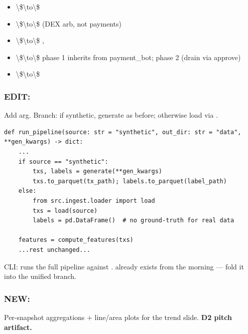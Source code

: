 \documentclass[11pt]{article}
\begin{document}
\begin{itemize}
  \item {} \textbackslash{}\$\textbackslash{}to\textbackslash{}\$ 
  \item {} \textbackslash{}\$\textbackslash{}to\textbackslash{}\$  (DEX arb, not payments)
  \item {} \textbackslash{}\$\textbackslash{}to\textbackslash{}\$ \textbf{}, 
  \item {} \textbackslash{}\$\textbackslash{}to\textbackslash{}\$ phase 1 inherits from payment\_bot; phase 2  (drain via approve)
  \item {} \textbackslash{}\$\textbackslash{}to\textbackslash{}\$ 
\end{itemize}
\subsubsection*{EDIT: }
Add  arg. Branch: if synthetic, generate as before; otherwise load via .

\begin{lstlisting}
def run_pipeline(source: str = "synthetic", out_dir: str = "data", **gen_kwargs) -> dict:
    ...
    if source == "synthetic":
        txs, labels = generate(**gen_kwargs)
        txs.to_parquet(tx_path); labels.to_parquet(label_path)
    else:
        from src.ingest.loader import load
        txs = load(source)
        labels = pd.DataFrame()  # no ground-truth for real data

    features = compute_features(txs)
    ...rest unchanged...
\end{lstlisting}
CLI:  runs the full pipeline against .  already exists from the morning --- fold it into the unified  branch.

\subsubsection*{NEW: }
Per-snapshot aggregations + line/area plots for the trend slide. \textbf{D2 pitch artifact.}
\end{document}
